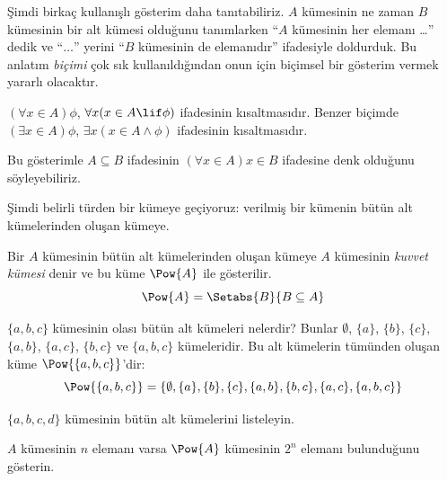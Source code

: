 \documentclass[../../../include/open-logic-section]{subfiles}
\begin{document}
Şimdi birkaç kullanışlı gösterim daha tanıtabiliriz. $A$ kümesinin ne zaman
$B$ kümesinin bir alt kümesi olduğunu tanımlarken ``$A$ kümesinin her elemanı
\dots'' dedik ve ``$\dots$'' yerini ``$B$ kümesinin de elemanıdır''
ifadesiyle doldurduk. Bu anlatım \emph{biçimi} çok sık kullanıldığından onun
için biçimsel bir gösterim vermek yararlı olacaktır.

\begin{defn}
$(\forall x \in A)\phi$, $\forall x(x \in A \lif \phi)$ ifadesinin
kısaltmasıdır. Benzer biçimde $(\exists x \in A)\phi$,
$\exists x(x \in A \land \phi)$ ifadesinin kısaltmasıdır.
\end{defn}

Bu gösterimle $A \subseteq B$ ifadesinin $(\forall x \in A)x \in B$
ifadesine denk olduğunu söyleyebiliriz.

Şimdi belirli türden bir kümeye geçiyoruz: verilmiş bir kümenin bütün
alt kümelerinden oluşan kümeye.

\begin{defn}
Bir $A$ kümesinin bütün alt kümelerinden oluşan kümeye $A$ kümesinin
\emph{kuvvet kümesi} denir ve bu küme $\Pow{A}$ ile gösterilir.
  \[
    \Pow{A} = \Setabs{B}{B \subseteq A}
  \]
\end{defn}

\begin{ex}
$\{ a, b, c \}$ kümesinin olası bütün alt kümeleri nelerdir? Bunlar
$\emptyset$, $\{a \}$, $\{b\}$, $\{c\}$, $\{a, b\}$, $\{a, c\}$,
$\{b, c\}$ ve $\{a, b, c\}$ kümeleridir. Bu alt kümelerin tümünden oluşan
küme $\Pow{\{a,b,c\}}$'dir:
\[
\Pow{\{ a, b, c \}} = \{\emptyset, \{a \}, \{b\}, \{c\}, \{a, b\},
\{b, c\}, \{a, c\}, \{a, b, c\}\}
\]
\end{ex}

\begin{prob}
$\{a, b, c, d\}$ kümesinin bütün alt kümelerini listeleyin.
\end{prob}

\begin{prob}
$A$ kümesinin $n$ elemanı varsa $\Pow{A}$ kümesinin $2^n$ elemanı bulunduğunu
gösterin.
\end{prob}
\end{document}
